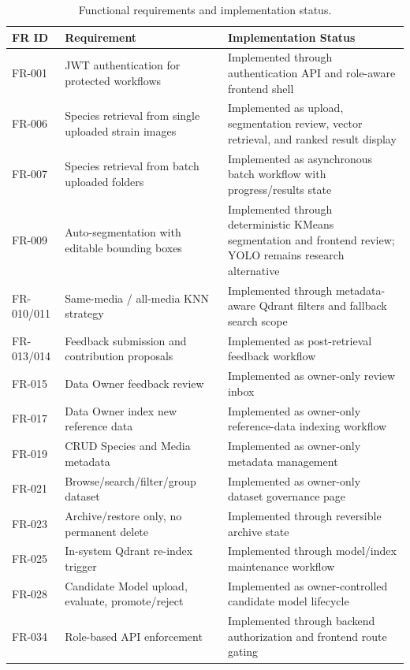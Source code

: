 \begin{table}[H]
\centering
\begin{tabular}{@{}p{3cm} p{4.5cm} p{6.5cm}@{}}
\toprule
\textbf{FR ID} & \textbf{Requirement} & \textbf{Implementation Status} \\
\midrule
FR-001 & JWT authentication for protected workflows & Implemented through authentication API and role-aware frontend shell \\
FR-006 & Species retrieval from single uploaded strain images & Implemented as upload, segmentation review, vector retrieval, and ranked result display \\
FR-007 & Species retrieval from batch uploaded folders & Implemented as asynchronous batch workflow with progress/results state \\
FR-009 & Auto-segmentation with editable bounding boxes & Implemented through deterministic KMeans segmentation and frontend review; YOLO remains research alternative \\
FR-010/011 & Same-media / all-media KNN strategy & Implemented through metadata-aware Qdrant filters and fallback search scope \\
FR-013/014 & Feedback submission and contribution proposals & Implemented as post-retrieval feedback workflow \\
FR-015 & Data Owner feedback review & Implemented as owner-only review inbox \\
FR-017 & Data Owner index new reference data & Implemented as owner-only reference-data indexing workflow \\
FR-019 & CRUD Species and Media metadata & Implemented as owner-only metadata management \\
FR-021 & Browse/search/filter/group dataset & Implemented as owner-only dataset governance page \\
FR-023 & Archive/restore only, no permanent delete & Implemented through reversible archive state \\
FR-025 & In-system Qdrant re-index trigger & Implemented through model/index maintenance workflow \\
FR-028 & Candidate Model upload, evaluate, promote/reject & Implemented as owner-controlled candidate model lifecycle \\
FR-034 & Role-based API enforcement & Implemented through backend authorization and frontend route gating \\
\bottomrule
\end{tabular}
\caption{Functional requirements and implementation status.}
\end{table}

